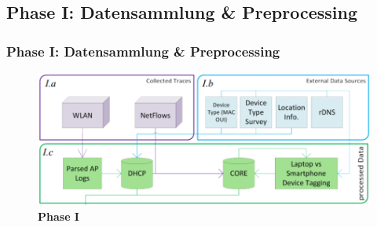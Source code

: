 \documentclass{beamer}
\begin{document}
\subsection{\textbf{Phase I}: Datensammlung \& Preprocessing}

\begin{frame}
  \frametitle{Phase I: Datensammlung \& Preprocessing}
  \begin{figure}
    \centering
    \includegraphics[width=\textwidth]{images/phase1.png}
    \caption*{\textbf{Phase I} \cite{Alipour2018}}
  \end{figure}  
\end{frame}
\end{document}
